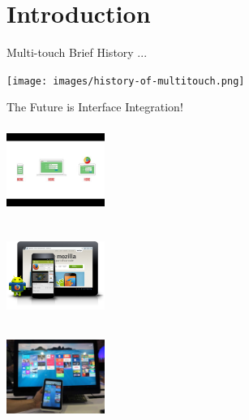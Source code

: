 \section{Introduction}

\begin{frame}%
\begin{block}{Multi-touch Brief History ...}
\begin{minipage}{1.0\linewidth}
\begin{center}
\texttt{[image: images/history-of-multitouch.png]}
\end{center}
\end{minipage}
\end{block}
\end{frame}

\begin{frame}%
\begin{block}{The Future is Interface Integration!}
\begin{minipage}{1.0\linewidth}
\begin{center}
\begin{minipage}{.32\linewidth}
\begin{center}
\includegraphics[height=28mm, width=32mm]{images/google.jpg}\\$\;$\\
\includegraphics[height=28mm, width=32mm]{images/android-phone-tablet.jpg}
\end{center}
\end{minipage}
\begin{minipage}{.32\linewidth}
\begin{center}
\includegraphics[height=28mm, width=32mm]{images/microsoft1.jpg}\\$\;$\\

\end{center}
\end{minipage}
\end{center}
\end{minipage}
\end{block}
\end{frame}
